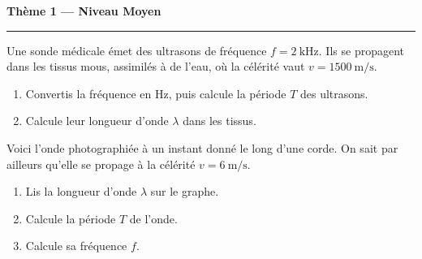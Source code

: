 \documentclass[11pt,a4paper]{article}
\begin{document}
\begin{center}
{\large\bfseries\color{primarydark} Thème 1 — Niveau Moyen}\\[-2pt]
{\color{primary}\rule{5cm}{1pt}}
\end{center}

\begin{exo}
Une sonde médicale émet des ultrasons de fréquence $f=\SI{2}{\kilo\hertz}$. Ils se propagent
dans les tissus mous, assimilés à de l'eau, où la célérité vaut $v=\SI{1500}{\metre\per\second}$.
\begin{enumerate}[label=\alph*)]
  \item Convertis la fréquence en \si{\hertz}, puis calcule la période $T$ des ultrasons.
  \item Calcule leur longueur d'onde $\lambda$ dans les tissus.
\end{enumerate}
\end{exo}

\begin{exo}
Voici l'onde photographiée à un instant donné le long d'une corde. On sait par ailleurs
qu'elle se propage à la célérité $v=\SI{6}{\metre\per\second}$.
\begin{center}
\end{center}
\begin{enumerate}[label=\alph*)]
  \item Lis la longueur d'onde $\lambda$ sur le graphe.
  \item Calcule la période $T$ de l'onde.
  \item Calcule sa fréquence $f$.
\end{enumerate}
\end{exo}
\end{document}
